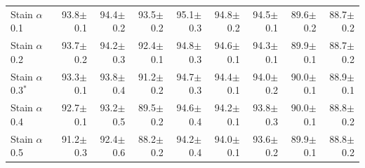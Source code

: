 \begin{table}[H]
\begin{tabular}{lrrrrrrrr}
\addlinespace
Stain $\alpha$ 0.1 & 93.8{\scriptsize$\pm$0.1} & 94.4{\scriptsize$\pm$0.2} & 93.5{\scriptsize$\pm$0.2} & 95.1{\scriptsize$\pm$0.3} & 94.8{\scriptsize$\pm$0.2} & 94.5{\scriptsize$\pm$0.1} & 89.6{\scriptsize$\pm$0.2} & 88.7{\scriptsize$\pm$0.2} \\
Stain $\alpha$ 0.2 & 93.7{\scriptsize$\pm$0.2} & 94.2{\scriptsize$\pm$0.3} & 92.4{\scriptsize$\pm$0.1} & 94.8{\scriptsize$\pm$0.3} & 94.6{\scriptsize$\pm$0.1} & 94.3{\scriptsize$\pm$0.1} & 89.9{\scriptsize$\pm$0.1} & 88.7{\scriptsize$\pm$0.2} \\
Stain $\alpha$ 0.3$^{*}$ & 93.3{\scriptsize$\pm$0.1} & 93.8{\scriptsize$\pm$0.4} & 91.2{\scriptsize$\pm$0.2} & 94.7{\scriptsize$\pm$0.3} & 94.4{\scriptsize$\pm$0.1} & 94.0{\scriptsize$\pm$0.2} & 90.0{\scriptsize$\pm$0.1} & 88.9{\scriptsize$\pm$0.1} \\
Stain $\alpha$ 0.4 & 92.7{\scriptsize$\pm$0.1} & 93.2{\scriptsize$\pm$0.5} & 89.5{\scriptsize$\pm$0.2} & 94.6{\scriptsize$\pm$0.4} & 94.2{\scriptsize$\pm$0.1} & 93.8{\scriptsize$\pm$0.3} & 90.0{\scriptsize$\pm$0.1} & 88.8{\scriptsize$\pm$0.2} \\
Stain $\alpha$ 0.5 & 91.2{\scriptsize$\pm$0.3} & 92.4{\scriptsize$\pm$0.6} & 88.2{\scriptsize$\pm$0.2} & 94.2{\scriptsize$\pm$0.4} & 94.0{\scriptsize$\pm$0.1} & 93.6{\scriptsize$\pm$0.2} & 89.9{\scriptsize$\pm$0.1} & 88.8{\scriptsize$\pm$0.2} \\
\bottomrule
\end{tabular}
\end{table}

